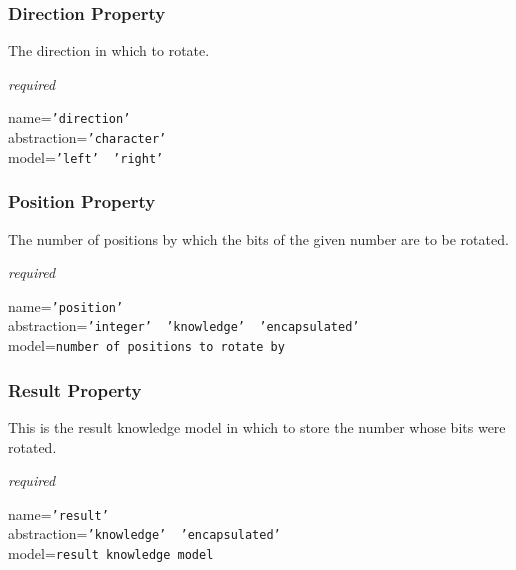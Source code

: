 \subsubsection{Direction Property}

The direction in which to rotate.

\emph{required}

name=\texttt{'direction'}\\
abstraction=\texttt{'character'}\\
model=\texttt{'left' \vline\ 'right'}

\subsubsection{Position Property}

The number of positions by which the bits of the given number are to be rotated.

\emph{required}

name=\texttt{'position'}\\
abstraction=\texttt{'integer' \vline\ 'knowledge' \vline\ 'encapsulated'}\\
model=\texttt{number of positions to rotate by}

\subsubsection{Result Property}

This is the result knowledge model in which to store the number whose bits were
rotated.

\emph{required}

name=\texttt{'result'}\\
abstraction=\texttt{'knowledge' \vline\ 'encapsulated'}\\
model=\texttt{result knowledge model}
